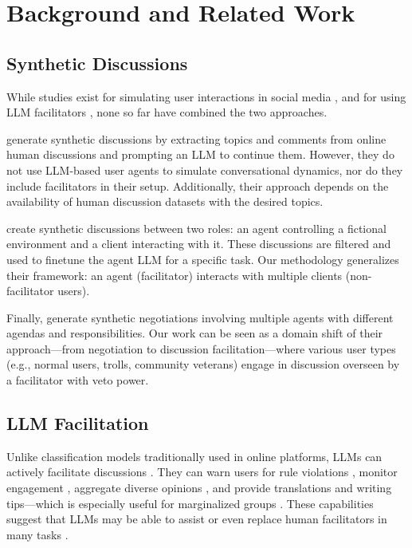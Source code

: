 %
\section{Background and Related Work}

\subsection{Synthetic Discussions}
\label{ssec:related:discussions}

While studies exist for simulating user interactions in social media \cite{park_simulacra, mou_2024, tornberg_2023, y_social, balog_2024}, and for using LLM facilitators \cite{kim_et_al_chatbot, cho-etal-2024-language}, none so far have combined the two approaches. 

\citet{balog_2024} generate synthetic discussions by extracting topics and comments from online human discussions and prompting an LLM to continue them. However, they do not use LLM-based user agents to simulate conversational dynamics, nor do they include facilitators in their setup. Additionally, their approach depends on the availability of human discussion datasets with the desired topics.

\citet{ulmer2024} create synthetic discussions between two roles: an agent controlling a fictional environment and a client interacting with it. These discussions are filtered and used to finetune the agent LLM for a specific task. Our methodology generalizes their framework: an agent (facilitator) interacts with multiple clients (non-facilitator users).

Finally, \citet{abdelnabi_negotiations} generate synthetic negotiations involving multiple agents with different agendas and responsibilities. Our work can be seen as a domain shift of their approach---from negotiation to discussion facilitation---where various user types (e.g., normal users, trolls, community veterans) engage in discussion overseen by a facilitator with veto power.


\subsection{LLM Facilitation}

Unlike classification models traditionally used in online platforms, LLMs can actively facilitate discussions \cite{korre2025evaluation}. They can warn users for rule violations \cite{Kumar_AbuHashem_Durumeric_2024}, monitor engagement \cite{schroeder-etal-2024-fora}, aggregate diverse opinions \cite{small-polis-llm}, and provide translations and writing tips---which is especially useful for marginalized groups \cite{Tsai2024Generative}. These capabilities suggest that LLMs may be able to assist or even replace human facilitators in many tasks \cite{small-polis-llm, seering_self_moderation}.

